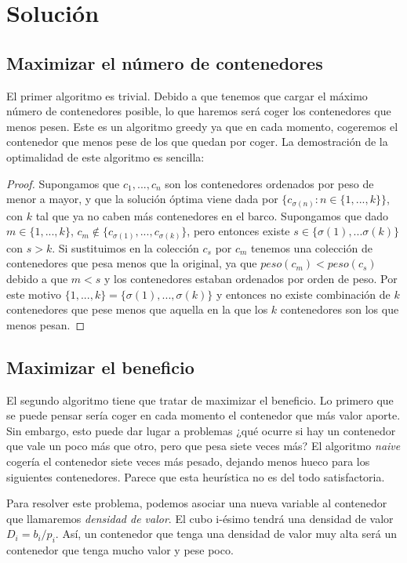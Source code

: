\documentclass[a4paper, 11pt]{article}
\begin{document}
\section{Solución}
\subsection{Maximizar el número de contenedores}
El primer algoritmo es trivial. Debido a que tenemos que cargar el máximo número de contenedores posible, lo que haremos será coger los contenedores que menos pesen. Este es un algoritmo greedy ya que en cada momento, cogeremos el contenedor que menos pese de los que quedan por coger. La demostración de la optimalidad de este algoritmo es sencilla:
\begin{proof}
Supongamos que $c_1, ..., c_n$ son los contenedores ordenados por peso de menor a mayor, y que la solución óptima viene dada por $ \{c_{\sigma(n)} : n \in \{1, ..., k \} \} $, con $k$ tal que ya no caben más contenedores en el barco. Supongamos que dado $m \in \{1, ..., k\}$,  $c_m \not\in \{c_{\sigma(1)}, ..., c_{\sigma(k)}\} $, pero entonces existe $ s \in \{\sigma(1), ... \sigma(k)\} $ con $ s > k $. Si sustituimos en la colección $c_s$ por $c_m$ tenemos una colección de contenedores que pesa menos que la original, ya que $peso(c_m) < peso(c_s)$ debido a que $m < s$ y los contenedores estaban ordenados por orden de peso. Por este motivo $\{1,...,k\} = \{\sigma(1), ..., \sigma(k)\}$ y entonces no existe combinación de $k$ contenedores que pese menos que aquella en la que los $k$ contenedores son los que menos pesan.
\end{proof}

\subsection{Maximizar el beneficio}
El segundo algoritmo tiene que tratar de maximizar el beneficio. Lo primero que se puede pensar sería coger en cada momento el contenedor que más valor aporte. Sin embargo, esto puede dar lugar a problemas ¿qué ocurre si hay un contenedor que vale un poco más que otro, pero que pesa siete veces más? El algoritmo \textit{naive} cogería el contenedor siete veces más pesado, dejando menos hueco para los siguientes contenedores. Parece que esta heurística no es del todo satisfactoria.

Para resolver este problema, podemos asociar una nueva variable al contenedor que llamaremos \textit{densidad de valor}. El cubo i-ésimo tendrá una densidad de valor $D_i = b_i/p_i$. Así, un contenedor que tenga una densidad de valor muy alta será un contenedor que tenga mucho valor y pese poco.
\end{document}

